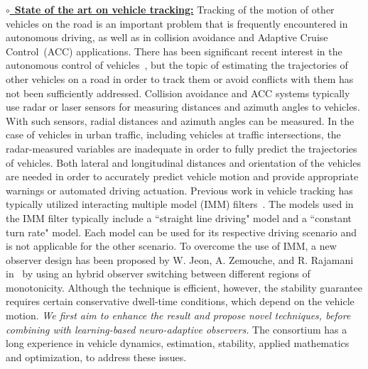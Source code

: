 \documentclass[a4paper,11pt]{article}
\begin{document}
\noindent
\underline{$\circ$~\bf State of the art on vehicle tracking:} Tracking of the motion of other vehicles on the road is an important problem that is frequently encountered in autonomous driving, as well as in collision avoidance and Adaptive Cruise Control~(ACC) applications. There has been significant recent interest in the autonomous control of vehicles~\cite{kommuri2016robust}, but the topic of estimating the trajectories of other vehicles on a road in order to track them or avoid conflicts with them has not been sufficiently addressed. Collision avoidance and ACC systems typically use radar or laser sensors for measuring distances and azimuth angles to vehicles. With such sensors, radial distances and azimuth angles can be measured. In the case of vehicles in urban traffic, including vehicles at traffic intersections, the radar-measured variables are inadequate in order to fully predict the trajectories of vehicles. Both lateral and longitudinal distances and orientation of the vehicles are needed in order to accurately predict vehicle motion and provide appropriate warnings or automated driving actuation. Previous work in vehicle tracking has typically utilized interacting multiple model (IMM) filters~\cite{jeon2017rear}. The models used in the IMM filter typically include a ``straight line driving" model and a ``constant turn rate" model. Each model can be used for its respective driving scenario and is not applicable for the other scenario. To overcome the use of IMM, a new observer design has been proposed by W. {\sc Jeon}, {A. \sc Zemouche}, and R. {\sc Rajamani} in~\cite{RAJAMANI2020108814} by using an hybrid observer switching between different regions of monotonicity. Although the technique is efficient, however, the stability guarantee requires certain conservative dwell-time conditions, which depend on the vehicle motion. {\it We first aim to enhance the result and propose novel techniques, before combining with learning-based neuro-adaptive observers.} The consortium has a long experience in vehicle dynamics, estimation, stability, applied mathematics and optimization, to address these issues.






\end{document}
